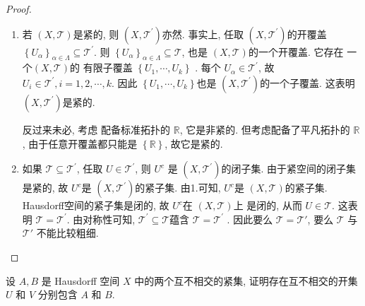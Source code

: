 \documentclass[../main.tex]{subfiles}
\begin{document}
\begin{proof}
    \begin{enumerate}
        \item 若 \(  \left( X,\mathcal{T} \right)   \)是紧的, 则 \(  \left( X, \mathcal{T}^{\prime}  \right)   \)亦然. 事实上, 任取 \(  \left( X,\mathcal{T}^{\prime}  \right)   \)的开覆盖 \(  \left\{ U_{\alpha } \right\}_{\alpha \in  \Lambda }\subseteq \mathcal{T}^{\prime}   \).  则 \(  \left\{ U_{\alpha } \right\}_{\alpha \in  \Lambda }\subseteq \mathcal{T}  \), 也是 \(  \left( X,\mathcal{T} \right)   \)的一个开覆盖. 它存在 一个\(  \left( X,\mathcal{T} \right)   \)的 有限子覆盖 \(  \left\{ U_1,\cdots ,U_{k} \right\} \)  . 每个 \(  U_{\alpha }  \in \mathcal{T}^{\prime} \), 故 \(  U_{i}\in \mathcal{T}^{\prime} , i= 1,2,\cdots ,k  \). 因此 \(  \left\{ U_1,\cdots ,U_{k} \right\}  \)也是 \(  \left( X,\mathcal{T}^{\prime}  \right)   \)的一个子覆盖. 这表明 \(  \left( X,\mathcal{T}^{\prime}  \right)   \)是紧的.   
        

        反过来未必, 考虑 配备标准拓扑的 \(  \mathbb{R}   \), 它是非紧的. 但考虑配备了平凡拓扑的 \(  \mathbb{R}   \), 由于任意开覆盖都只能是 \(  \left\{ \mathbb{R}  \right\}  \), 故它是紧的.   
        \item 如果 \(  \mathcal{T}\subseteq \mathcal{T}^{\prime}   \),  任取 \(  U\in \mathcal{T}^{\prime}   \), 则 \(  U^{c}  \)     是 \(  \left( X,\mathcal{T}^{\prime}  \right)   \)的闭子集. 由于紧空间的闭子集是紧的, 故 \(  U^{c}  \)是 \(  \left( X,\mathcal{T}^{\prime}  \right)   \)的紧子集. 由1.可知, \(  U^{c}  \)是 \(  \left( X,\mathcal{T} \right)   \)的紧子集. Hausdorff空间的紧子集是闭的, 故 \(  U^{c}  \)在 \(  \left( X,\mathcal{T} \right)   \)上   是闭的, 从而 \(  U\in \mathcal{T}  \). 这表明 \(  \mathcal{T}= \mathcal{T}^{\prime}   \).  由对称性可知,  \(  \mathcal{T}^{\prime} \subseteq \mathcal{T}  \)蕴含 \(  \mathcal{T}= \mathcal{T}^{\prime}   \)       . 因此要么 $\mathcal{T} = \mathcal{T}'$, 要么 $\mathcal{T}$ 与 $\mathcal{T}'$ 不能比较粗细.
    \end{enumerate}
    
\end{proof}
\begin{exercise}{}{}
设 $A, B$ 是 Hausdorff 空间 $X$ 中的两个互不相交的紧集, 证明存在互不相交的开集 $U$ 和 $V$ 分别包含 $A$ 和 $B$.
\end{exercise}
\end{document}
